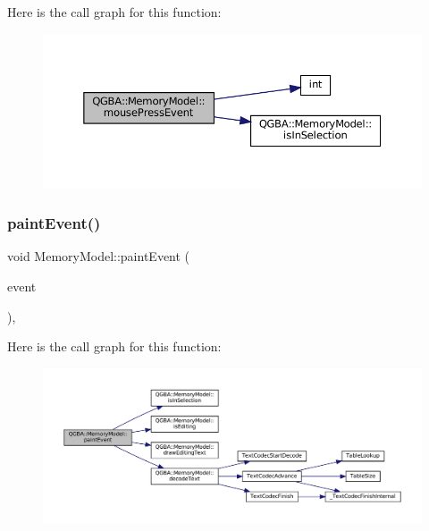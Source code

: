 Here is the call graph for this function\+:
\nopagebreak
\begin{figure}[H]
\begin{center}
\leavevmode
\includegraphics[width=350pt]{class_q_g_b_a_1_1_memory_model_ab5958f08380d72823c9c0ce7e8a70937_cgraph}
\end{center}
\end{figure}
\mbox{\label{class_q_g_b_a_1_1_memory_model_a35ec506c640db58309a8e5857f25dae2}} 
\subsubsection{\texorpdfstring{paint\+Event()}{paintEvent()}}
{\footnotesize\ttfamily void Memory\+Model\+::paint\+Event (\begin{DoxyParamCaption}\item[{Q\+Paint\+Event $\ast$}]{event }\end{DoxyParamCaption})\hspace{0.3cm}{\ttfamily [override]}, {\ttfamily [protected]}}

Here is the call graph for this function\+:
\nopagebreak
\begin{figure}[H]
\begin{center}
\leavevmode
\includegraphics[width=350pt]{class_q_g_b_a_1_1_memory_model_a35ec506c640db58309a8e5857f25dae2_cgraph}
\end{center}
\end{figure}
\mbox{\label{class_q_g_b_a_1_1_memory_model_a9160c33072a3eb745beb90c39cf1d01b}} 
